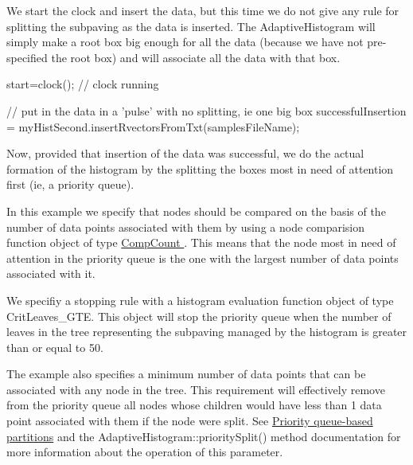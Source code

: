 \-We start the clock and insert the data, but this time we do not give any rule for splitting the subpaving as the data is inserted. \-The \-Adaptive\-Histogram will simply make a root box big enough for all the data (because we have not pre-\/specified the root box) and will associate all the data with that box.


\begin{DoxyCodeInclude}
    start=clock();
    // clock running

    // put in the data in a 'pulse' with no splitting, ie one big box
    successfulInsertion = myHistSecond.insertRvectorsFromTxt(samplesFileName);

\end{DoxyCodeInclude}


\-Now, provided that insertion of the data was successful, we do the actual formation of the histogram by the splitting the boxes most in need of attention first (ie, a priority queue).

\-In this example we specify that nodes should be compared on the basis of the number of data points associated with them by using a node comparision function object of type \hyperlink{classsubpavings_1_1CompCount}{\-Comp\-Count }. \-This means that the node most in need of attention in the priority queue is the one with the largest number of data points associated with it.

\-We specifiy a stopping rule with a histogram evaluation function object of type \-Crit\-Leaves\-\_\-\-G\-T\-E. \-This object will stop the priority queue when the number of leaves in the tree representing the subpaving managed by the histogram is greater than or equal to 50.

\-The example also specifies a minimum number of data points that can be associated with any node in the tree. \-This requirement will effectively remove from the priority queue all nodes whose children would have less than 1 data point associated with them if the node were split. \-See \hyperlink{AdaptiveHistograms_adhsubsec_pq}{\-Priority queue-\/based partitions} and the \-Adaptive\-Histogram\-::priority\-Split() method documentation for more information about the operation of this parameter.


